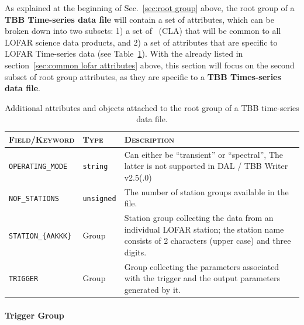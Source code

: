 \documentclass[a4paper,10pt,bibtotoc]{scrartcl}
\begin{document}
As explained at the beginning of Sec.~\ref{sec:root group} above, the
root group of a \textbf{TBB Time-series data file} will contain a set
of attributes, which can be broken down into two subsets: 1) a set of
\cla\ (CLA) that will be common to all LOFAR science data products,
and 2) a set of attributes that are specific to LOFAR Time-series data
(see Table~\ref{tab:hdf5 root group}). With the {\cla} already listed
in section~\ref{sec:common lofar attributes} above, this section will
focus on the second subset of root group attributes, as they are
specific to a \textbf{TBB Times-series data file}.

\begin{table}[htbp]
  \centering
  \begin{tabular}{|llp{9cm}|}
    \hline
    \textsc{Field/Keyword} & \textsc{Type} & \textsc{Description} \\
    \hline
    \hline
    \verb|OPERATING_MODE| & \verb|string| & Can either be ``transient'' or
    ``spectral'', The latter is not supported in DAL / TBB Writer v2.5(.0) \\
    \verb|NOF_STATIONS| & \verb|unsigned| &  The number of station groups
    available in the file.\\
    \verb|STATION_{AAKKK}| & Group & Station group collecting the data
    from an individual LOFAR station; the station name consists of 2
    characters (upper case) and three digits.\\
    \verb|TRIGGER| & Group & Group collecting the
    parameters associated with the trigger and the output
    parameters generated by it. \\
    \hline
  \end{tabular}
  \caption{Additional attributes and objects attached to the root
    group of a TBB time-series data file.}
  \label{tab:hdf5 root group}
\end{table}

\clearpage



\paragraph{Trigger Group}
\end{document}
